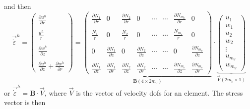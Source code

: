 and then 
\[
\vec{\dot\varepsilon}^h=
\left(
\begin{array}{c}
\frac{\partial u^h}{\partial r} \\ \\
\frac{u^h}{r} \\ \\
\frac{\partial w^h}{\partial z} \\ \\
\frac{\partial u^h}{\partial z} + \frac{\partial w^h}{\partial r} 
\end{array}
\right)
=
\underbrace{
\left(
\begin{array}{ccccccccc}
\frac{\partial N_1}{\partial r} &  0 &  
\frac{\partial N_2}{\partial r} &  0 & 
\cdots & \cdots &
\frac{\partial N_{m_\upnu}}{\partial r} &  0 
\\  \\
\frac{N_1}{r}  & 0 &  
\frac{N_2}{r}  & 0 & 
\cdots & \cdots &
\frac{N_{m_\upnu}}{r}  & 0  
\\  \\
0 & \frac{\partial N_1}{\partial z}  &
0 & \frac{\partial N_2}{\partial z}  &  
\cdots & \cdots &
0 & \frac{\partial N_{m_\upnu}}{\partial z}   
\\ \\
\frac{\partial N_1}{\partial z} & \frac{\partial N_1}{\partial r}  &
\frac{\partial N_2}{\partial z} & \frac{\partial N_2}{\partial r}  & \cdots & \cdots &
\frac{\partial N_{m_\upnu}}{\partial z} & \frac{\partial N_{m_\upnu}}{\partial r}  
\end{array}
\right)
}_{\bm B (4\times 2 m_\upnu) }
\cdot
\underbrace{
\left(
\begin{array}{c}
u_1 \\  w_1 \\ u_2 \\  w_2  \\ \vdots \\ u_{m_\upnu} \\ w_{m_\upnu} 
\end{array}
\right)
}_{\vec V ( 2m_\upnu \times1)}
\]
or $\vec{\dot{\varepsilon}}^h= {\bm B} \cdot \vec{V}$, where $\vec{V}$ is the vector 
of velocity dofs for an element.
The stress vector is then 
